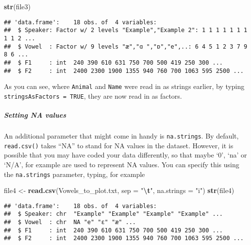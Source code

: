 \documentclass[
]{article}
\newenvironment{Shaded}{\begin{snugshade}}{\end{snugshade}}
\newcommand{\AttributeTok}[1]{\textcolor[rgb]{0.13,0.29,0.53}{#1}}
\newcommand{\FunctionTok}[1]{\textcolor[rgb]{0.13,0.29,0.53}{\textbf{#1}}}
\newcommand{\NormalTok}[1]{#1}
\newcommand{\OtherTok}[1]{\textcolor[rgb]{0.56,0.35,0.01}{#1}}
\newcommand{\SpecialCharTok}[1]{\textcolor[rgb]{0.81,0.36,0.00}{\textbf{#1}}}
\newcommand{\StringTok}[1]{\textcolor[rgb]{0.31,0.60,0.02}{#1}}
\begin{document}
\begin{Shaded}
\begin{Highlighting}[]
\FunctionTok{str}\NormalTok{(file3)}
\end{Highlighting}
\end{Shaded}

\begin{verbatim}
## 'data.frame':    18 obs. of  4 variables:
##  $ Speaker: Factor w/ 2 levels "Example","Example 2": 1 1 1 1 1 1 1 1 1 2 ...
##  $ Vowel  : Factor w/ 9 levels "æ","ɑ ","ɒ","e",..: 6 4 5 1 2 3 7 9 8 6 ...
##  $ F1     : int  240 390 610 631 750 700 500 419 250 300 ...
##  $ F2     : int  2400 2300 1900 1355 940 760 700 1063 595 2500 ...
\end{verbatim}

As you can see, where \texttt{Animal} and \texttt{Name} were read in as
strings earlier, by typing \texttt{stringsAsFactors\ =\ TRUE}, they are
now read in as factors.

\hypertarget{setting-na-values}{%
\subparagraph{Setting NA values}\label{setting-na-values}}

An additional parameter that might come in handy is \texttt{na.strings}.
By default, \texttt{read.csv()} takes ``NA'' to stand for NA values in
the dataset. However, it is possible that you may have coded your data
differently, so that maybe `0', `na' or `N/A', for example are used to
represent NA values. You can specify this using the \texttt{na.strings}
parameter, typing, for example

\begin{Shaded}
\begin{Highlighting}[]
\NormalTok{file4 }\OtherTok{\textless{}{-}} \FunctionTok{read.csv}\NormalTok{(}\StringTok{\textquotesingle{}Vowels\_to\_plot.txt\textquotesingle{}}\NormalTok{, }\AttributeTok{sep =} \StringTok{"}\SpecialCharTok{\textbackslash{}t}\StringTok{"}\NormalTok{, }\AttributeTok{na.strings =} \StringTok{"i"}\NormalTok{)}
\FunctionTok{str}\NormalTok{(file4)}
\end{Highlighting}
\end{Shaded}

\begin{verbatim}
## 'data.frame':    18 obs. of  4 variables:
##  $ Speaker: chr  "Example" "Example" "Example" "Example" ...
##  $ Vowel  : chr  NA "e" "ɛ" "æ" ...
##  $ F1     : int  240 390 610 631 750 700 500 419 250 300 ...
##  $ F2     : int  2400 2300 1900 1355 940 760 700 1063 595 2500 ...
\end{verbatim}
\end{document}
